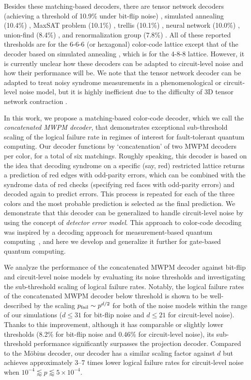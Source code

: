 \documentclass[a4paper,twocolumn,11pt,accepted=2025-01-21]{quantumarticle}
\theoremstyle{definition}
\theoremstyle{definition}
\theoremstyle{definition}
\begin{document}
Besides these matching-based decoders, there are tensor network decoders (achieving a threshold of 10.9\% under bit-flip noise) \cite{chubb2021general}, simulated annealing (10.4\%) \cite{takada2024ising}, MaxSAT problem (10.1\%) \cite{berent2024decoding}, trellis (10.1\%) \cite{sabo2022trellis}, neural network (10.0\%) \cite{maskara2019advantages}, union-find (8.4\%) \cite{delfosse2021almostlinear}, and renormalization group (7.8\%) \cite{sarvepalli2012efficient}.  
All of these reported thresholds are for the 6-6-6 (or hexagonal) color-code lattice except that of the decoder based on simulated annealing \cite{takada2024ising}, which is for the 4-8-8 lattice.
However, it is currently unclear how these decoders can be adapted to circuit-level noise and how their performance will be.
We note that the tensor network decoder can be adapted to treat noisy syndrome measurements in a phenomenological or circuit-level noise model, but it is highly inefficient due to the difficulty of 3D tensor network contraction \cite{piveteau2024tensor}.

In this work, we propose a matching-based color-code decoder, which we call the \emph{concatenated MWPM decoder}, that demonstrates exceptional sub-threshold scaling of the logical failure rate in regimes of interest for fault-tolerant quantum computing.  Our decoder functions by `concatenation' of two MWPM decoders per color, for a total of six matchings.
Roughly speaking, this decoder is based on the idea that decoding syndrome on a specific (say, red) restricted lattice returns a prediction of red edges with odd-parity errors, which can be combined with the syndrome data of red checks (specifying red faces with odd-parity errors) and decoded again to predict errors.
This process is repeated for each of the three colors and the most probable prediction is selected as the final prediction.
We demonstrate that this decoder can be generalized to handle circuit-level noise by using the concept of \emph{detector error model}.
This approach to color-code decoding was inspired by a decoding approach for measurement-based quantum computing~\cite{lee2022universal}, and here we develop and generalize it further for gate-based quantum computing.

We analyze the performance of the concatenated MWPM decoder against bit-flip and circuit-level noise models by evaluating its noise thresholds and investigating the sub-threshold scaling of logical failure rates.
Notably, the logical failure rates of the concatenated MWPM decoder below threshold is shown to be well-described by the scaling $p_{\mathrm{fail}} \sim p^{d/2}$ for both of the noise models within the range of our simulations ($d \leq 31$ for bit-flip noise and $d \leq 21$ for circuit-level noise).
Thanks to this improvement, although it has comparable or slightly lower thresholds (8.2\% for bit-flip noise and 0.46\% for circuit-level noise), its sub-threshold performance significantly surpasses the projection decoder.
Compared to the Möbius decoder, our decoder has a similar scaling factor against $d$ but achieves approximately 3--7 times lower logical failure rates for circuit-level noise when $10^{-4} \lessapprox p \lessapprox 5 \times 10^{-4}$.
\end{document}
